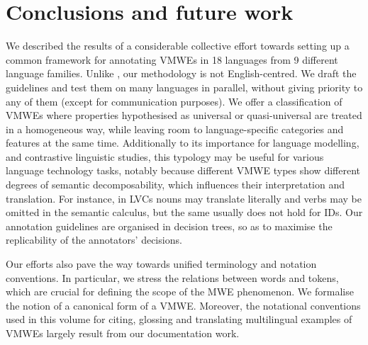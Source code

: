 \documentclass[output=paper,
modfonts,
]{langscibook}
\begin{document}
\section{Conclusions and future work}
\label{sec:conclusions}
%
We described the results of a considerable collective effort towards setting up a common framework for annotating VMWEs in 18 languages from 9 different language families. Unlike \citet{mcdonald-EtAl:2013:Short}, our methodology is not English-centred. We draft the guidelines and test them on many languages in parallel, without giving priority to any of them (except for communication purposes). 
We offer a classification of VMWEs where properties hypothesised as universal or quasi-universal are treated in a homogeneous way, while leaving room to language-specific categories and features at the same time. Additionally to its importance for language modelling, and contrastive linguistic studies, this typology may be useful for various language technology tasks, notably because different VMWE types show different degrees of semantic decomposability, which influences their interpretation and translation. For instance, in LVCs nouns may translate literally and verbs may be omitted in the semantic calculus,  but the same usually does not hold for IDs.
Our annotation guidelines are organised in decision trees, so as to maximise the replicability of the annotators' decisions. 

Our efforts also pave the way towards unified terminology and notation conventions. In particular, we stress the relations between words and tokens, which are crucial for defining the scope of the MWE phenomenon. We formalise the notion of a canonical form of a VMWE. Moreover, the notational conventions used in this volume for citing, glossing and translating multilingual examples of VMWEs largely result from our documentation work.
\end{document}
